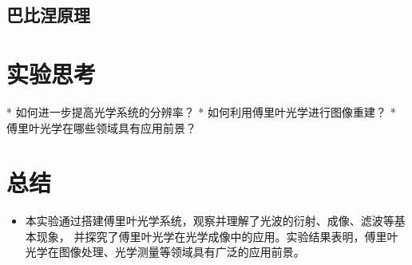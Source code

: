 \documentclass{ctexart}
\begin{document}
\subsection{巴比涅原理}


\section{实验思考}
* 如何进一步提高光学系统的分辨率？
* 如何利用傅里叶光学进行图像重建？
* 傅里叶光学在哪些领域具有应用前景？

\section{总结}
\begin{itemize}
  \item 本实验通过搭建傅里叶光学系统，观察并理解了光波的衍射、成像、滤波等基本现象，
  并探究了傅里叶光学在光学成像中的应用。实验结果表明，傅里叶光学在图像处理、光学测量等领域具有广泛的应用前景。

\end{itemize}
\end{document}
